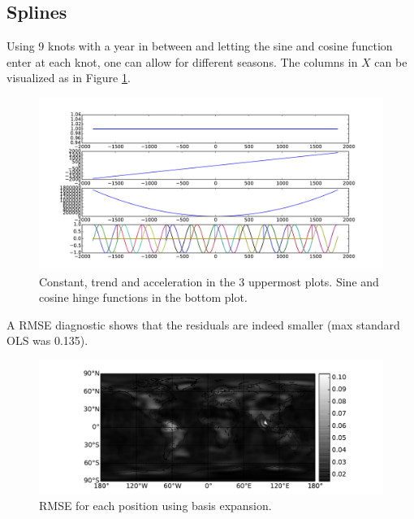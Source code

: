 \subsection{Splines}
Using 9 knots with a year in between and letting the sine and cosine function enter at each knot, one can allow for different seasons. The columns in $X$ can be visualized as in Figure \ref{fig:splines-x-columns}.
\begin{figure}[H]
	\centering
	\includegraphics[width=\textwidth]{figures/splines-x-columns}
	\caption{Constant, trend and acceleration in the 3 uppermost plots. Sine and cosine hinge functions in the bottom plot.}
	\label{fig:splines-x-columns}
\end{figure}

A RMSE diagnostic shows that the residuals are indeed smaller (max standard OLS was 0.135).

\begin{figure}[H]
	\centering
	\includegraphics[width=\textwidth]{figures/splines-rmse}
	\caption{RMSE for each position using basis expansion.}
	\label{fig:splines-rmse}
\end{figure}

